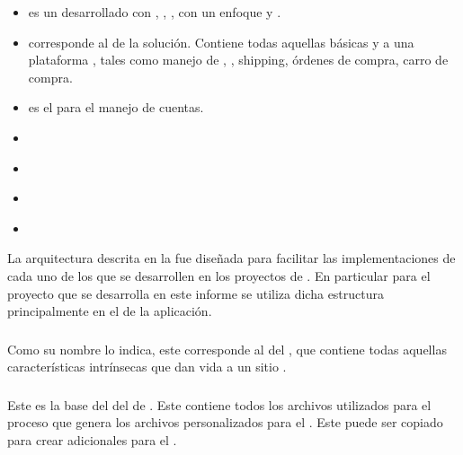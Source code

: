 	\begin{itemize}
		\item
			\textbf{\eframeworkAF} es un \frameworkPC \ecommerceCOM desarrollado con \meteorNAME, \nodejsNAME, \mongodbNAME, con un enfoque \reactive y \realTimeINT.
		\item
			\textbf{\eframeworkCorePCKG} corresponde al \coreAS de la solución. Contiene todas aquellas \featuresCPT básicas y \templatesAS a una plataforma \ecommerceCOM, tales como manejo de \itemsCOM, \sessionsINT, shipping, órdenes de compra, carro de compra.
		\item
			\textbf{\eframeworkAccountsPCKG} es el \moduleAS para el manejo de cuentas.
		\item
			\textbf{\eframeworkCoreThemePCKG}
		\item
			\textbf{\eframeworkBootstrapThemePCKG}
		\item
			\textbf{\eframeworkShippingPCKG}
		\item
			\textbf{\eframeworkPaypalPCKG}
		
	\end{itemize}


La arquitectura descrita en la  fue diseñada para facilitar las implementaciones de cada uno de los \packagesAS que se desarrollen en los proyectos de \meteorNAME. En particular para el proyecto que se desarrolla en este informe se utiliza dicha estructura principalmente en el \packagesAS \coreAS de la aplicación.

\subsubsection{\eframeworkCorePCKG}

Como su nombre lo indica, este \packagesAS corresponde al \coreAS del \frameworkPC, que contiene todas aquellas características intrínsecas que dan vida a un sitio \ecommerceCOM. 

\subsubsection{\eframeworkCoreThemePCKG}\label{chapter:section:subsection:package_core_theme}

Este \packagesAS es la base del \bootstrap \themeCPT del \frameworkPC de \ecommerceCOM. Este contiene todos los archivos \lessNAME utilizados para el proceso que genera los archivos \lessNAME personalizados para el \frameworkPC. Este \packagesAS puede ser copiado para crear \themeCPT adicionales para el \frameworkPC \ecommerceCOM.

